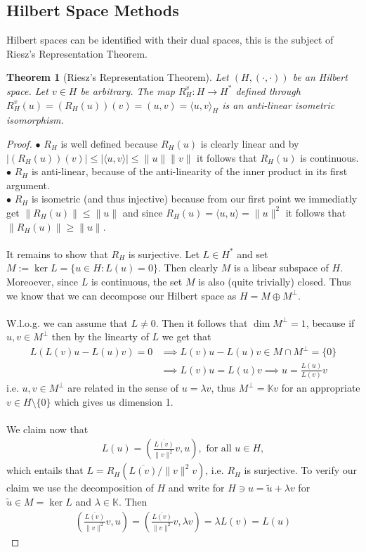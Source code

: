 \documentclass[11pt,a4paper]{article}
\newtheorem{thm}{Theorem}[section]
\theoremstyle{definition}
\begin{document}
\subsection{Hilbert Space Methods}
Hilbert spaces can be identified with their dual spaces, this is the subject of Riesz's Representation Theorem. 
\begin{thm}[Riesz's Representation Theorem] Let $(H,( \cdot , \cdot))$ be an Hilbert space. Let $v \in H$ be arbitrary. The map $R_H^v : H \to H^*$ defined through $R_H^v(u)=(R_H(u))(v)=(u,v)=\langle u,v\rangle_{H}$ is an anti-linear isometric isomorphism. 
\end{thm}
\begin{proof}
$\bullet$ $R_H$ is well defined because $R_H(u)$ is clearly linear and by $|(R_H(u))(v)| \leq | \langle u,v \rangle | \leq \|u \| \|v\|$ it follows that $R_H(u)$ is continuous. \\
$\bullet$ $R_H$ is anti-linear, because of the anti-linearity of the inner product in its first argument. \\
$\bullet$ $R_H$ is isometric (and thus injective) because from our first point we immediatly get $\|R_H(u)\| \leq \|u\|$ and since $R_H(u)= \langle u,u \rangle = \|u\|^2$ it follows that $\|R_H(u)\| \geq \|u\|$.
\\\\
It remains to show that $R_H$ is surjective. Let $L \in H^*$ and set $M :=\ker L = \lbrace u \in H : L(u)=0 \rbrace$. Then clearly $M$ is a libear subspace of $H$. Moreoever, since $L$ is continuous, the set $M$ is also (quite trivially) closed. Thus we know that we can decompose our Hilbert space as $H= M \oplus M^\perp$. \\\\
W.l.o.g. we can assume that $L \neq 0$. Then it follows that $\dim M^\perp = 1$, because if $u,v \in M^\perp$ then by the linearty of $L$ we get that
\begin{align*}
L(L(v)u-L(u)v)=0 &\implies L(v)u-L(u)v \in M \cap M^\perp = \lbrace 0 \rbrace \\ 
&\implies L(v)u=L(u)v \implies u= \frac{L(u)}{L(v)}v
\end{align*} 
i.e. $u,v \in M^\perp$ are related in the sense of $u = \lambda v$, thus $M^\perp = \mathbb{K}v$ for an appropriate $v \in H \setminus \lbrace 0 \rbrace$ which gives us dimension 1. \\
\\
We claim now that 
\begin{align*}
L(u)= \left( \frac{\overline{L(v)}}{\|v\|^2}v,u \right), \text{ for all } u \in H,
\end{align*}
which entails that $L = R_H( \overline{L(v)}/\|v\|^2 v)$, i.e. $R_H$ is surjective. To verify our claim we use the decomposition of $H$ and write for $H \ni u = \tilde{u} + \lambda v$ for $\tilde{u} \in M = \ker L$ and $\lambda \in \mathbb{K}$. Then 
\begin{align*}
\left( \frac{\overline{L(v)}}{\|v\|^2}v,u \right) = \left( \frac{\overline{L(v)}}{\|v\|^2}v, \lambda v \right) = \lambda L(v)= L(u)
\end{align*}
\end{proof}
\end{document}
